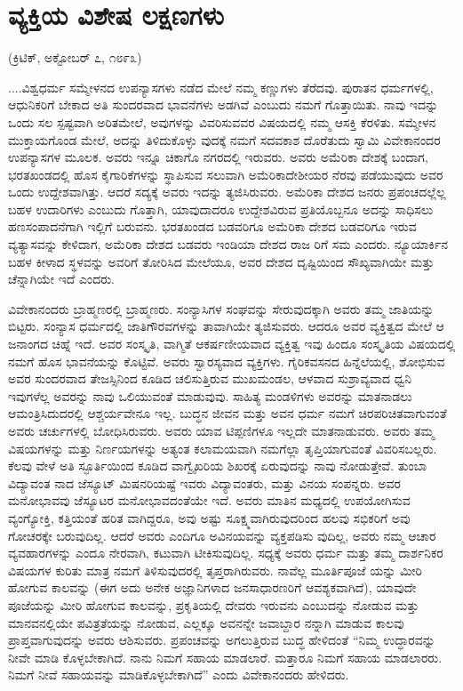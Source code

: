 \delimiter


\section{ವ್ಯಕ್ತಿಯ ವಿಶೇಷ ಲಕ್ಷಣಗಳು}

\begin{center}
(ಕ್ರಿಟಿಕ್​, ಅಕ್ಟೋಬರ್​ ೭, ೧೮೯೩)
\end{center}

....ವಿಶ್ವಧರ್ಮ ಸಮ್ಮೇಳನದ ಉಪನ್ಯಾಸಗಳು ನಡೆದ ಮೇಲೆ ನಮ್ಮ ಕಣ್ಣುಗಳು ತೆರೆದವು. ಪುರಾತನ ಧರ್ಮಗಳಲ್ಲಿ, ಆಧುನಿಕರಿಗೆ ಬೇಕಾದ ಅತಿ ಸುಂದರವಾದ ಭಾವನೆಗಳು ಅಡಗಿವೆ ಎಂಬುದು ನಮಗೆ ಗೊತ್ತಾಯಿತು. ನಾವು ಇದನ್ನು ಒಂದು ಸಲ ಸ್ಪಷ್ಟವಾಗಿ ಅರಿತಮೇಲೆ, ಅವುಗಳನ್ನು ವಿವರಿಸುವವರ ವಿಷಯದಲ್ಲಿ ನಮ್ಮ ಆಸಕ್ತಿ ಕೆರಳಿತು. ಸಮ್ಮೇಳನ ಮುಕ್ತಾಯಗೊಂಡ ಮೇಲೆ, ಅದನ್ನು ತಿಳಿದುಕೊಳ್ಳು ವುದಕ್ಕೆ ನಮಗೆ ಸದವಕಾಶ ದೊರೆತುದು ಸ್ವಾಮಿ ವಿವೇಕಾನಂದರ ಉಪನ್ಯಾಸಗಳ ಮೂಲಕ. ಅವರು ಇನ್ನೂ ಚಿಕಾಗೊ ನಗರದಲ್ಲಿ ಇರುವರು. ಅವರು ಅಮೆರಿಕಾ ದೇಶಕ್ಕೆ ಬಂದಾಗ, ಭರತಖಂಡದಲ್ಲಿ ಹೊಸ ಕೈಗಾರಿಕೆಗಳನ್ನು ಸ್ಥಾಪಿಸುವ ಸಲುವಾಗಿ ಅಮೆರಿಕಾದೇಶೀಯರ ನೆರವು ಪಡೆಯುವುದು ಅವರ ಒಂದು ಉದ್ದೇಶವಾಗಿತ್ತು. ಆದರೆ ಸದ್ಯಕ್ಕೆ ಅವರು ಇದನ್ನು ತ್ಯಜಿಸಿರುವರು. ಅಮೆರಿಕಾ ದೇಶದ ಜನರು ಪ್ರಪಂಚದಲ್ಲೆಲ್ಲ ಬಹಳ ಉದಾರಿಗಳು ಎಂಬುದು ಗೊತ್ತಾಗಿ, ಯಾವುದಾದರೂ ಉದ್ದೇಶವಿರುವ ಪ್ರತಿಯೊಬ್ಬನೂ ಅದನ್ನು ಸಾಧಿಸಲು ಹಣಸಂಪಾದನೆಗಾಗಿ ಇಲ್ಲಿಗೆ ಬರುವನು. ಭರತಖಂಡದ ಬಡವರಿಗೂ ಅಮೆರಿಕಾ ದೇಶದ ಬಡವರಿಗೂ ಇರುವ ವ್ಯತ್ಯಾಸವನ್ನು ಕೇಳಿದಾಗ, ಅಮೆರಿಕಾ ದೇಶದ ಬಡವರು ಇಂಡಿಯಾ ದೇಶದ ರಾಜ ರಿಗೆ ಸಮ ಎಂದರು. ನ್ಯೂಯಾರ್ಕಿನ ಬಹಳ ಕೀಳಾದ ಸ್ಥಳವನ್ನು ಅವರಿಗೆ ತೋರಿಸಿದ ಮೇಲೆಯೂ, ಅವರ ದೇಶದ ದೃಷ್ಟಿಯಿಂದ ಸೌಖ್ಯವಾಗಿಯೇ ಮತ್ತು ಚೆನ್ನಾಗಿಯೇ ಇದೆ ಎಂದರು.

ವಿವೇಕಾನಂದರು ಬ್ರಾಹ್ಮಣರಲ್ಲಿ ಬ್ರಾಹ್ಮಣರು. ಸಂನ್ಯಾಸಿಗಳ ಸಂಘವನ್ನು ಸೇರುವುದಕ್ಕಾಗಿ ಅವರು ತಮ್ಮ ಜಾತಿಯನ್ನು ಬಿಟ್ಟರು. ಸಂನ್ಯಾಸ ಧರ್ಮದಲ್ಲಿ ಜಾತಿಗೌರವಗಳನ್ನು ತಾವಾಗಿಯೇ ತ್ಯಜಿಸುವರು. ಆದರೂ ಅವರ ವ್ಯಕ್ತಿತ್ವದ ಮೇಲೆ ಆ ಜನಾಂಗದ ಚಿಹ್ನೆ ಇದೆ. ಅವರ ಸಂಸ್ಕೃತಿ, ವಾಗ್ಮಿತೆ ಆಕರ್ಷಣೀಯವಾದ ವ್ಯಕ್ತಿತ್ವ ಇವು ಹಿಂದೂ ಸಂಸ್ಕೃತಿಯ ವಿಷಯದಲ್ಲಿ ನಮಗೆ ಹೊಸ ಭಾವನೆಯನ್ನು ಕೊಟ್ಟಿವೆ. ಅವರು ಸ್ವಾರಸ್ಯವಾದ ವ್ಯಕ್ತಿಗಳು. ಗೈರಿಕವಸನದ ಹಿನ್ನೆಲೆಯಲ್ಲಿ, ಶೋಭಿಸುವ ಅವರ ಸುಂದರವಾದ ತೇಜಸ್ಸಿನಿಂದ ಕೂಡಿದ ಚಲಿಸುತ್ತಿರುವ ಮುಖಮಂಡಲ, ಆಳವಾದ ಸುಶ್ರಾವ್ಯವಾದ ಧ್ವನಿ ಇವುಗಳೆಲ್ಲ ಅವರನ್ನು ನಾವು ಒಲಿಯುವಂತೆ ಮಾಡುವುವು. ಸಾಹಿತ್ಯ ಮಂಡಳಿಗಳು ಅವರನ್ನು ಮಾತನಾಡಲು ಆಮಂತ್ರಿಸಿದುದರಲ್ಲಿ ಆಶ್ಚರ್ಯವೇನೂ ಇಲ್ಲ. ಬುದ್ಧನ ಜೀವನ ಮತ್ತು ಅವನ ಧರ್ಮ ನಮಗೆ ಚಿರಪರಿಚಿತವಾಗುವಂತೆ ಅವರು ಚರ್ಚುಗಳಲ್ಲಿ ಬೋಧಿಸಿರುವರು. ಅವರು ಯಾವ ಟಿಪ್ಪಣಿಗಳೂ ಇಲ್ಲದೇ ಮಾತನಾಡುವರು. ಅವರು ತಮ್ಮ ವಿಷಯಗಳನ್ನು ಮತ್ತು ನಿರ್ಣಯಗಳನ್ನು ಅತ್ಯಂತ ಕಲಾಮಯವಾಗಿ ನಮಗೆಲ್ಲಾ ತೃಪ್ತಿಯಾಗುವಂತೆ ವಿವರಿಸಬಲ್ಲರು. ಕೆಲವು ವೇಳೆ ಅತಿ ಸ್ಫೂರ್ತಿಯಿಂದ ಕೂಡಿದ ವಾಗ್ವೈಖರಿಯ ಶಿಖರಕ್ಕೆ ಏರುವುದನ್ನು ನಾವು ನೋಡುತ್ತೇವೆ. ತುಂಬಾ ವಿದ್ಯಾವಂತ ನಾದ ಜೆಸ್ಯೂಟ್​ ಮಿಷನರಿಯಷ್ಟೆ ಇವರು ವಿದ್ಯಾವಂತರು, ಮತ್ತು ವಿನಯ ಸಂಪನ್ನರು. ಅವರ ಮನೋಭಾವವು ಜೆಸ್ಯೂಟರ ಮನೋಭಾವದಂತೆಯೇ ಇದೆ. ಅವರು ಮಾತಿನ ಮಧ್ಯದಲ್ಲಿ ಉಪಯೋಗಿಸುವ ವ್ಯಂಗ್ಯೋಕ್ತಿ, ಕತ್ತಿಯಂತೆ ಹರಿತ ವಾಗಿದ್ದರೂ, ಅವು ಅಷ್ಟು ಸೂಕ್ಷ್ಮವಾಗಿರುವುದರಿಂದ ಹಲವು ಸಭಿಕರಿಗೆ ಅವು ಗೋಚರಕ್ಕೇ ಬರುವುದಿಲ್ಲ. ಆದರೆ ಅವರು ಎಂದಿಗೂ ಅವಿನಯವನ್ನು ವ್ಯಕ್ತಪಡಿಸು ವುದಿಲ್ಲ, ಅವರು ನಮ್ಮ ಆಚಾರ ವ್ಯವಹಾರಗಳನ್ನು ಎಂದೂ ನೇರವಾಗಿ, ಕಟುವಾಗಿ ಟೀಕಿಸುವುದಿಲ್ಲ. ಸಧ್ಯಕ್ಕೆ ಅವರು ಧರ್ಮ ಮತ್ತು ತಮ್ಮ ದಾರ್ಶನಿಕರ ವಿಷಯಗಳ ಕುರಿತು ಮಾತ್ರ ನಮಗೆ ತಿಳಿಸುವುದರಲ್ಲಿ ತೃಪ್ತರಾಗಿರುವರು. ನಾವೆಲ್ಲ ಮೂರ್ತಿಪೂಜೆ ಯನ್ನು ಮೀರಿ ಹೋಗುವ ಕಾಲವನ್ನು (ಈಗ ಅದು ಅನೇಕ ಅಜ್ಞಾನಿಗಳಾದ ಜನಸಾಧಾರಣರಿಗೆ ಆವಶ್ಯಕವಾಗಿದೆ), ಯಾವುದೇ ಪೂಜೆಯನ್ನು ಮೀರಿ ಹೋಗುವ ಕಾಲವನ್ನು, ಪ್ರಕೃತಿಯಲ್ಲಿ ದೇವರು ಇರುವನು ಎಂಬುದನ್ನು ನೋಡುವ ಮತ್ತು ಮಾನವನಲ್ಲಿಯೇ ಪವಿತ್ರತೆಯನ್ನು ನೋಡುವ, ಎಲ್ಲಕ್ಕೂ ಅವನನ್ನೇ ಜವಾಬ್ದಾರ ನನ್ನಾಗಿ ಮಾಡುವ ಕಾಲವು ಪ್ರಾಪ್ತವಾಗುವುದನ್ನು ಅವರು ಆಶಿಸುವರು. ಪ್ರಪಂಚವನ್ನು ಅಗಲುತ್ತಿರುವ ಬುದ್ಧ ಹೇಳಿದಂತೆ “ನಿಮ್ಮ ಉದ್ಧಾರವನ್ನು ನೀವೇ ಮಾಡಿ ಕೊಳ್ಳಬೇಕಾಗಿದೆ. ನಾನು ನಿಮಗೆ ಸಹಾಯ ಮಾಡಲಾರೆ. ಮತ್ತಾರೂ ನಿಮಗೆ ಸಹಾಯ ಮಾಡಲಾರರು. ನಿಮಗೆ ನೀವೆ ಸಹಾಯವನ್ನು ಮಾಡಿಕೊಳ್ಳಬೇಕಾಗಿದೆ” ಎಂದು ವಿವೇಕಾನಂದರು ಹೇಳಿದರು.

